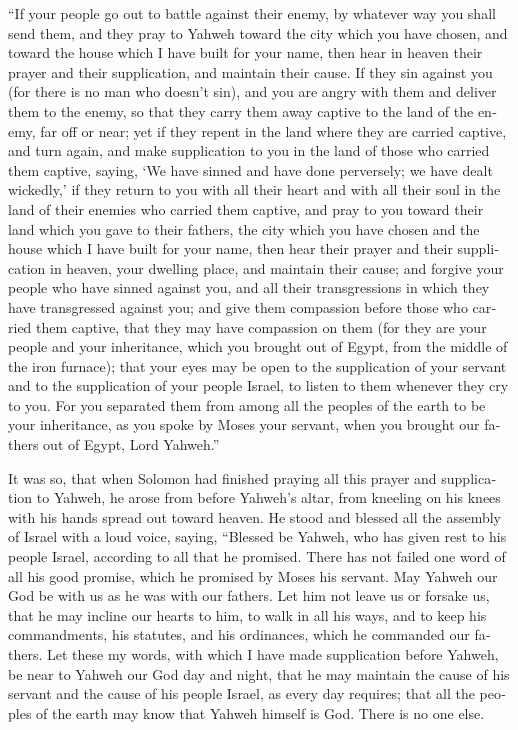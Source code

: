 \begin{paracol}{2}
\begin{otherlanguage}{english}
 ``If your people go out to battle against their enemy,
by whatever way you shall send them, and they pray to Yahweh toward the
city which you have chosen, and toward the house which I have built for
your name,  then hear in heaven their prayer and their
supplication, and maintain their cause.  If they sin
against you (for there is no man who doesn't sin), and you are angry
with them and deliver them to the enemy, so that they carry them away
captive to the land of the enemy, far off or near;  yet
if they repent in the land where they are carried captive, and turn
again, and make supplication to you in the land of those who carried
them captive, saying, `We have sinned and have done perversely; we have
dealt wickedly,'  if they return to you with all their
heart and with all their soul in the land of their enemies who carried
them captive, and pray to you toward their land which you gave to their
fathers, the city which you have chosen and the house which I have built
for your name,  then hear their prayer and their
supplication in heaven, your dwelling place, and maintain their cause;
 and forgive your people who have sinned against you, and
all their transgressions in which they have transgressed against you;
and give them compassion before those who carried them captive, that
they may have compassion on them  (for they are your
people and your inheritance, which you brought out of Egypt, from the
middle of the iron furnace);  that your eyes may be open
to the supplication of your servant and to the supplication of your
people Israel, to listen to them whenever they cry to you.
 For you separated them from among all the peoples of the
earth to be your inheritance, as you spoke by Moses your servant, when
you brought our fathers out of Egypt, Lord Yahweh.''

 It was so, that when Solomon had finished praying all
this prayer and supplication to Yahweh, he arose from before Yahweh's
altar, from kneeling on his knees with his hands spread out toward
heaven.  He stood and blessed all the assembly of Israel
with a loud voice, saying,  ``Blessed be Yahweh, who has
given rest to his people Israel, according to all that he promised.
There has not failed one word of all his good promise, which he promised
by Moses his servant.  May Yahweh our God be with us as
he was with our fathers. Let him not leave us or forsake us,
 that he may incline our hearts to him, to walk in all
his ways, and to keep his commandments, his statutes, and his
ordinances, which he commanded our fathers.  Let these my
words, with which I have made supplication before Yahweh, be near to
Yahweh our God day and night, that he may maintain the cause of his
servant and the cause of his people Israel, as every day requires;
 that all the peoples of the earth may know that Yahweh
himself is God. There is no one else.


\end{otherlanguage}
\end{paracol}
